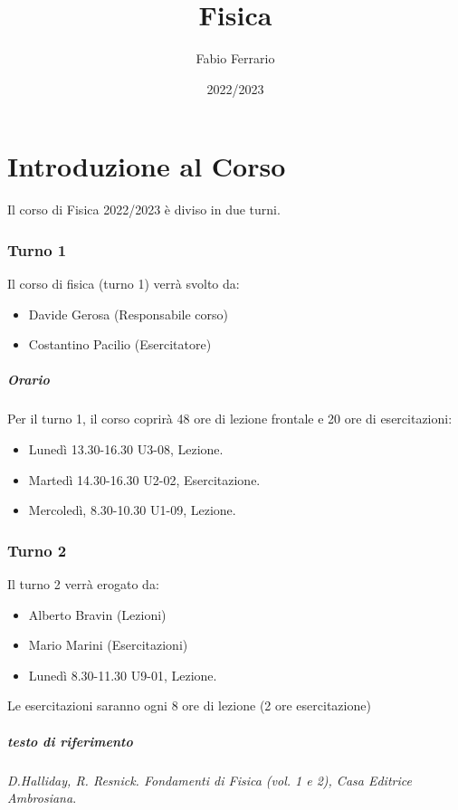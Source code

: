 \documentclass[12pt, a4paper, openany]{book}
\begin{document}
\title{Fisica}
\author{Fabio Ferrario}
\date{2022/2023}
\maketitle

\tableofcontents

\chapter{Introduzione al Corso}
Il corso di Fisica 2022/2023 è diviso in due turni.
\subsection{Turno 1}
Il corso di fisica (turno 1) verrà svolto da:
\begin{itemize}
    \item Davide Gerosa (Responsabile corso)
    \item Costantino Pacilio (Esercitatore)
\end{itemize}
\paragraph*{Orario} Per il turno 1, il corso coprirà 48 ore di lezione frontale e 20 ore di esercitazioni:
\begin{itemize}
    \item Lunedì 13.30-16.30 U3-08, Lezione.
    \item Martedì 14.30-16.30 U2-02, Esercitazione.
    \item Mercoledì, 8.30-10.30 U1-09, Lezione.
\end{itemize}
\subsection{Turno 2}
Il turno 2 verrà erogato da:
\begin{itemize}
    \item Alberto Bravin (Lezioni)
    \item Mario Marini (Esercitazioni)
\end{itemize}
\begin{itemize}
    \item Lunedì 8.30-11.30 U9-01, Lezione.

\end{itemize}
Le esercitazioni saranno ogni 8 ore di lezione (2 ore esercitazione)

\paragraph*{testo di riferimento} \emph{D.Halliday, R. Resnick. Fondamenti di Fisica (vol. 1 e 2), Casa Editrice Ambrosiana}.
\end{document}

